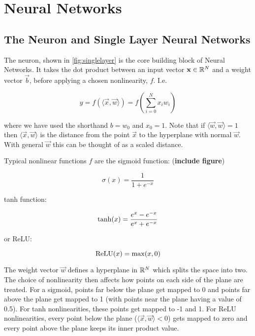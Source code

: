 \section{Neural Networks}\label{sec:cnns}

\subsection{The Neuron and Single Layer Neural Networks}

The neuron, shown in \autoref{fig:singlelayer} is the core building block of
Neural Networks. It takes the dot product between an  input vector $\vec{x} \in
\reals[N]$ and a weight vector $\vec{b}$, before applying a chosen nonlinearity,
$f$. I.e.

$$y = f(\langle\vec{x}, \vec{w}\rangle) = f\left(\sum_{i=0}^{N} x_i w_i \right) $$

where we have used the shorthand $b=w_0$ and $x_0 = 1$. 
Note that if $\langle\vec{w}, \vec{w}\rangle = 1$ then $\langle\vec{x},
\vec{w}\rangle$ is the distance from the point $\vec{x}$ to the hyperplane with
normal $\vec{w}$. With general $\vec{w}$ this can be thought of as a scaled
distance.  

Typical nonlinear functions $f$ are the sigmoid function: (\textbf{include figure})

$$\sigma(x) = \frac{1}{1+e^{-x}}$$

tanh function:

$$\F{tanh}(x) = \frac{e^{x} - e^{-x}}{e^{x} + e^{-x}}$$

or ReLU:

$$\F{ReLU}(x) = \max (x, 0)$$

The weight vector $\vec{w}$ defines a hyperplane in $\reals[N]$ which splits the
space into two. The choice of nonlinearity then affects how points on each side
of the plane are treated. For a sigmoid, points far below the plane get mapped
to 0 and points far above the plane get mapped to 1 (with points near the plane
having a value of 0.5). For tanh nonlinearities, these points get mapped to -1
and 1. For ReLU nonlinearities, every point below the plane ($\langle\vec{x},
\vec{w}\rangle < 0$) gets mapped to zero and every point above the plane keeps
its inner product value.

\begin{figure}
  \centering
  \label{fig:singlelayer}
\end{figure}

